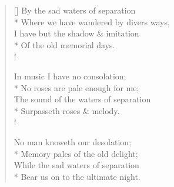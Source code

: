 \documentclass[MAIN]{subfiles}
\begin{document}
\settowidth{\versewidth}{\vin Where we have wandered by divers ways,}
\begin{verse}[\versewidth]
By the sad waters of separation\\*
\vin Where we have wandered by divers ways,\\
I have but the shadow \& imitation\\*
\vin Of the old memorial days.\\!

In music I have no consolation;\\*
\vin No roses are pale enough for me;\\
The sound of the waters of separation\\*
\vin Surpasseth roses \& melody.\\!

No man knoweth our desolation;\\*
\vin Memory pales of the old delight;\\
While the sad waters of separation\\*
\vin Bear us on to the ultimate night.
\end{verse}
\end{document}
